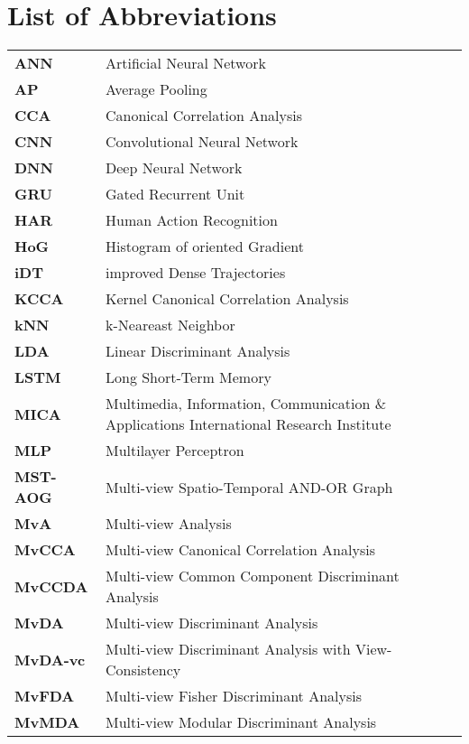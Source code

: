 
\cleardoublepage
{}
\chapter*{List of Abbreviations}

\begin{longtable}{p{} p{}}
    \textbf{ANN} & Artificial Neural Network\\
    \textbf{AP} & Average Pooling\\
    \textbf{CCA} & Canonical Correlation Analysis\\
    \textbf{CNN} & Convolutional Neural Network\\
    \textbf{DNN} & Deep Neural Network\\
    \textbf{GRU} & Gated Recurrent Unit\\
    \textbf{HAR} & Human Action Recognition\\
    \textbf{HoG} & Histogram of oriented Gradient\\
    \textbf{iDT} & improved Dense Trajectories\\
    \textbf{KCCA} & Kernel Canonical Correlation Analysis\\
    \textbf{kNN} & k-Neareast Neighbor\\
    \textbf{LDA} & Linear Discriminant Analysis\\
    \textbf{LSTM} & Long Short-Term Memory\\
    \textbf{MICA} & Multimedia, Information, Communication \& Applications International Research Institute\\
    \textbf{MLP} & Multilayer Perceptron\\
    \textbf{MST-AOG} & Multi-view Spatio-Temporal AND-OR Graph\\
    \textbf{MvA} & Multi-view Analysis\\
    \textbf{MvCCA} & Multi-view Canonical Correlation Analysis\\
    \textbf{MvCCDA} & Multi-view Common Component Discriminant Analysis\\
    \textbf{MvDA} & Multi-view Discriminant Analysis\\
    \textbf{MvDA-vc} & Multi-view Discriminant Analysis with View-Consistency\\
    \textbf{MvFDA} & Multi-view Fisher Discriminant Analysis\\
    \textbf{MvMDA} & Multi-view Modular Discriminant Analysis\\

\end{longtable}
